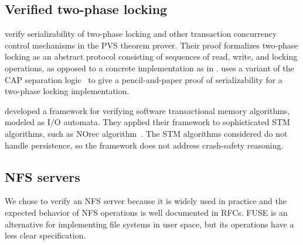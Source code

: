 
\subsection{Verified two-phase locking}

\citet{ChkliaevHS99} verify serializability of two-phase locking and other
transaction concurrency control mechanisms in the PVS theorem prover. Their
proof formalizes two-phase locking as an abstract protocol consisting of
sequences of read, write, and locking operations, as opposed to a concrete
implementation as in \sys. \citet{pollak-2PL} uses a variant of the
CAP separation logic~\citep{dinsdale:cap} to give a pencil-and-paper
proof of serializability for a two-phase locking implementation.

\citet{mohsen:stm} developed a framework for verifying software transactional memory algorithms, modeled
as I/O automata. They applied their framework to sophisticated STM algorithms, such as
NOrec algorithm~\cite{dalessandro:norec}. The STM algorithms considered do not
handle persistence, so the framework does not address crash-safety reasoning.



\subsection{NFS servers}

We chose to verify an NFS server because it is widely used in practice
and the expected behavior of NFS operations is well documented in
RFCs.  FUSE is an alternative for implementing file systems in user
space, but its operations have a less clear specification.

